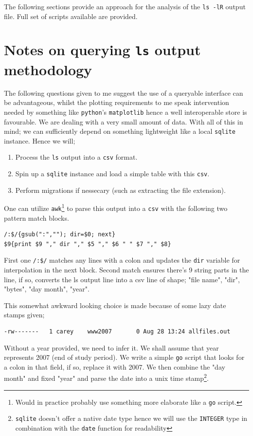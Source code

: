 \documentclass{article}
\begin{document}
\newpage
The following sections provide an approach for the analysis of the \texttt{ls -lR} output file. Full set of scripts available are provided.
\section*{Notes on querying \texttt{ls} output methodology}
The following questions given to me suggest the use of a queryable interface can be advantageous, whilst the plotting requirements to me speak intervention needed by something like \texttt{python}'s \texttt{matplotlib} hence a well interoperable store is favourable. We are dealing with a very small amount of data.  With all of this in mind; we can sufficiently depend on something lightweight like a local \texttt{sqlite} instance. Hence we will;

\begin{enumerate}
				\item Process the \texttt{ls} output into a \texttt{csv} format.
				\item Spin up a \texttt{sqlite} instance and load a simple table with this \texttt{csv}.
				\item Perform migrations if nessecary (such as extracting the file extension).
\end{enumerate}

One can utilize \texttt{awk}\footnote{Would in practice probably use something more elaborate like a \texttt{go} script.} to parse this output into a \texttt{csv} with the following two pattern match blocks.
\begin{small}
\begin{verbatim}
/:$/{gsub(":",""); dir=$0; next}
$9{print $9 "," dir "," $5 "," $6 " " $7 "," $8}
\end{verbatim}
\end{small}

First one \texttt{/:\$/} matches any lines with a colon and updates the \texttt{dir} variable for interpolation in the next block. Second match ensures there's 9 string parts in the line, if so, converts the ls output line into a csv line of shape; "file name", "dir", "bytes", "day month", "year".

This somewhat awkward looking choice is made because of some lazy date stamps given;
\begin{small}
\begin{verbatim}
-rw-------   1 carey    www2007       0 Aug 28 13:24 allfiles.out
\end{verbatim}
\end{small}
Without a year provided, we need to infer it. We shall assume that year represents 2007 (end of study period). We write a simple \texttt{go} script that looks for a colon in that field, if so, replace it with 2007. We then combine the "day month" and fixed "year" and parse the date into a unix time stamp\footnote{\texttt{sqlite} doesn't offer a native date type hence we will use the \texttt{INTEGER} type in combination with the \texttt{date} function for readability}.
\end{document}

